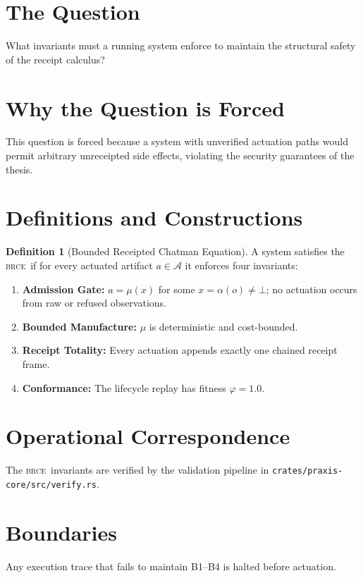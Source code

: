 \documentclass[11pt,oneside]{book}
\theoremstyle{definition}
\newtheorem{definition}{Definition}[chapter]
\theoremstyle{plain}
\theoremstyle{remark}
\newcommand{\Act}{\mathcal{A}}                 %
\newcommand{\muop}{\mu}                        %
\newcommand{\adm}{\alpha}                      %
\newcommand{\Rfsl}{\bot}                        %
\newcommand{\Fitness}{\varphi}
\newcommand{\BRCE}{\textsc{brce}}
\newcommand{\code}[1]{\texttt{#1}}
\begin{document}
\section{The Question}
What invariants must a running system enforce to maintain the structural safety of the receipt calculus? %

\section{Why the Question is Forced}
This question is forced because a system with unverified actuation paths would permit arbitrary unreceipted side effects, violating the security guarantees of the thesis. %

\section{Definitions and Constructions}

\begin{definition}[Bounded Receipted Chatman Equation]\label{def:brce_invariants}
A system satisfies the \BRCE\ if for every actuated artifact $a \in \Act$ it enforces four invariants: %
\begin{enumerate}[label=(B\arabic*),leftmargin=*]
  \item \textbf{Admission Gate:} $a = \muop(x)$ for some $x = \adm(o) \neq \Rfsl$; no actuation occurs from raw or refused observations. %
  \item \textbf{Bounded Manufacture:} $\muop$ is deterministic and cost-bounded. %
  \item \textbf{Receipt Totality:} Every actuation appends exactly one chained receipt frame. %
  \item \textbf{Conformance:} The lifecycle replay has fitness $\Fitness = 1.0$. %
\end{enumerate}
\end{definition}

\section{Operational Correspondence}
The \BRCE\ invariants are verified by the validation pipeline in \code{crates/praxis-core/src/verify.rs}. %

\section{Boundaries}
Any execution trace that fails to maintain B1–B4 is halted before actuation. %
\end{document}
